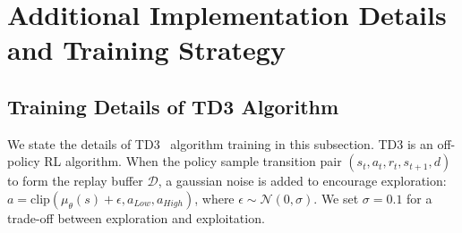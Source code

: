 \section{Additional Implementation Details and Training Strategy}
\label{sec:details}
\subsection{Training Details of TD3 Algorithm}
We state the details of TD3~\cite{fujimoto2018addressing-td3} algorithm training in this subsection. TD3 is an off-policy RL algorithm. When the policy sample transition pair $(s_t,a_t,r_t,s_{t+1},d)$  to form the  replay buffer  $\mathcal{D}$, a gaussian noise is added to encourage exploration: $a= \text{clip}\left(\mu_{\theta}(s) + \epsilon, a_{Low}, a_{High}\right)$, where $ \epsilon \sim \mathcal{N}(0, \sigma) $. We set $\sigma = 0.1$ for a trade-off between exploration and exploitation. 

